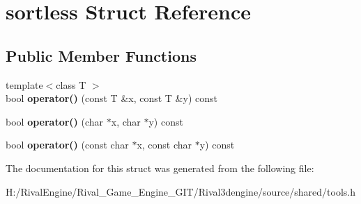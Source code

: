 \hypertarget{structsortless}{}\section{sortless Struct Reference}
\label{structsortless}
\subsection*{Public Member Functions}
\begin{DoxyCompactItemize}
\item 
\mbox{\label{structsortless_a37bff8982a0c27465cdd7f5c689f0ebc}} 
{\footnotesize template$<$class T $>$ }\\bool {\bfseries operator()} (const T \&x, const T \&y) const
\item 
\mbox{\label{structsortless_af5cdad9958fa97b55a29ddb09854ea76}} 
bool {\bfseries operator()} (char $\ast$x, char $\ast$y) const
\item 
\mbox{\label{structsortless_a6a7a0feaa26105de717e5041de0414c2}} 
bool {\bfseries operator()} (const char $\ast$x, const char $\ast$y) const
\end{DoxyCompactItemize}


The documentation for this struct was generated from the following file\+:\begin{DoxyCompactItemize}
\item 
H\+:/\+Rival\+Engine/\+Rival\+\_\+\+Game\+\_\+\+Engine\+\_\+\+G\+I\+T/\+Rival3dengine/source/shared/tools.\+h\end{DoxyCompactItemize}
